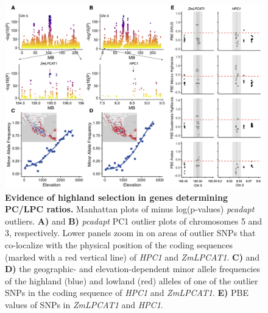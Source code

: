 \documentclass[9pt,twocolumn,twoside,lineno]{BioRxiv}
\begin{document}
\begin{figure}[ht]
\begin{center}
\includegraphics[width=0.6\paperwidth]{Figures/Fig_2.png}
\caption{\textbf{Evidence of highland selection in genes determining PC/LPC ratios.}
Manhattan plots of minus log(p‐values) \textit{pcadapt} outliers. 
\textbf{A)} and \textbf{B)} \textit{pcadapt} PC1 outlier plots of chromosomes 5 and 3, respectively. 
Lower panels zoom in on areas of outlier SNPs that co-localize with the physical position of the coding sequences (marked with a red vertical line) of \textit{HPC1} and \textit{ZmLPCAT1}. 
\textbf{C)} and \textbf{D)} the geographic- and elevation-dependent minor allele frequencies of the highland (blue) and lowland (red) alleles of one of the outlier SNPs in the coding sequence of \textit{HPC1} and \textit{ZmLPCAT1}.
\textbf{E)} PBE values of SNPs in \textit{ZmLPCAT1} and \textit{HPC1}.} 
\label{Fig2}
\end{center}
\end{figure}
\end{document}
